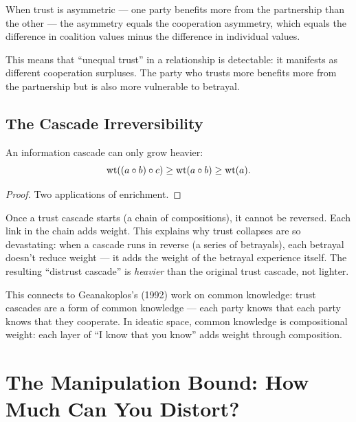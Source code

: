 \begin{interpretation}
When trust is asymmetric --- one party benefits more from the partnership than the other --- the asymmetry equals the cooperation asymmetry, which equals the difference in coalition values minus the difference in individual values.

This means that ``unequal trust'' in a relationship is detectable: it manifests as different cooperation surpluses. The party who trusts more benefits more from the partnership but is also more vulnerable to betrayal.
\end{interpretation}

\section{The Cascade Irreversibility}

\begin{theorem}
An information cascade can only grow heavier:
\[
\operatorname{wt}((a \circ b) \circ c) \geq \operatorname{wt}(a \circ b) \geq \operatorname{wt}(a).
\]
\end{theorem}

\begin{proof}
Two applications of enrichment.
\end{proof}

\begin{interpretation}
Once a trust cascade starts (a chain of compositions), it cannot be reversed. Each link in the chain adds weight. This explains why trust collapses are so devastating: when a cascade runs in reverse (a series of betrayals), each betrayal doesn't reduce weight --- it adds the weight of the betrayal experience itself. The resulting ``distrust cascade'' is \emph{heavier} than the original trust cascade, not lighter.

This connects to Geanakoplos's (1992) work on common knowledge: trust cascades are a form of common knowledge --- each party knows that each party knows that they cooperate. In ideatic space, common knowledge is compositional weight: each layer of ``I know that you know'' adds weight through composition.
\end{interpretation}


\chapter{The Manipulation Bound: How Much Can You Distort?}

